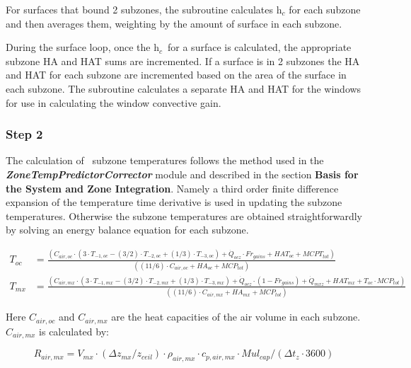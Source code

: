 {For surfaces that bound 2 subzones, the subroutine calculates h\(_{c}\) for each subzone and then averages them, weighting by the amount of surface in each subzone.

During the surface loop, once the h\(_{c}\)~for a surface is calculated, the appropriate subzone HA and HAT sums are incremented. If a surface is in 2 subzones the HA and HAT for each subzone are incremented based on the area of the surface in each subzone. The subroutine calculates a separate HA and HAT for the windows for use in calculating the window convective gain.

\subsubsection{Step 2}\label{step-2-1}

The calculation of~ subzone temperatures follows the method used in the \textbf{\emph{ZoneTempPredictorCorrector}} module and described in the section \textbf{Basis for the System and Zone Integration}. Namely a third order finite difference expansion of the temperature time derivative is used in updating the subzone temperatures. Otherwise the subzone temperatures are obtained straightforwardly by solving an energy balance equation for each subzone.

\begin{equation}
  \begin{array}{cl}
    T_{oc} & = \frac{(C_{air,oc} \cdot (3 \cdot T_{ - 1,oc} - (3/2) \cdot T_{ - 2,oc} + (1/3) \cdot T_{ - 3,oc}) + \dot Q_{ocz} \cdot Fr_{gains} + HAT_{oc} + MCPT_{tot})} {((11/6) \cdot C_{air,oc} + HA_{oc} + MCP_{tot})} \\
    T_{mx} & = \frac{(C_{air,mx} \cdot (3 \cdot T_{ - 1,mx} - (3/2) \cdot T_{ - 2,mx} + (1/3) \cdot T_{ - 3,mx}) + \dot Q_{ocz} \cdot (1 - Fr_{gains}) + \dot Q_{mxz} + HAT_{mx} + T_{oc} \cdot MCP_{tot})} {((11/6) \cdot C_{air,mx} + HA_{mx} + MCP_{tot})}
  \end{array}
\end{equation}

Here \({C_{air,oc}}\) and \({C_{air,mx}}\) are the heat capacities of the air volume in each subzone. \({C_{air,mx}}\) is calculated by:

\begin{equation}
{R_{air,mx}} = {V_{mx}} \cdot \left( {\Delta {z_{mx}}/{z_{ceil}}} \right) \cdot {\rho_{air,mx}} \cdot {c_{p,air,mx}} \cdot Mu{l_{cap}}/\left( {\Delta {t_z} \cdot 3600} \right)
\end{equation}

}
